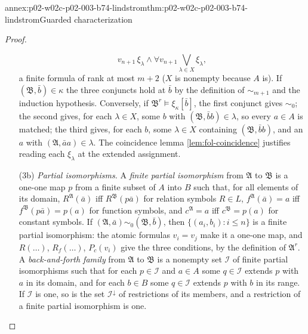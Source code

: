 \begin{annexitem}{annex:p02-w02c-p02-003-b74-lindstrom}{thm:p02-w02c-p02-003-b74-lindstrom}{Guarded characterization}
\begin{proof}
\begin{enumerate}
\[       v_{n+1}\,\xi_\lambda\land\forall v_{n+1}\bigvee_{\lambda\in X}\xi_\lambda ,
      \]
      a finite formula of rank at most \(m+2\) (\(X\) is nonempty because
      \(A\) is).  If \((\mathfrak B,\bar b)\in\kappa\) the three conjuncts
      hold at \(\bar b\) by the definition of \(\sim_{m+1}\) and the
      induction hypothesis.  Conversely, if \(\mathfrak B^{r}\models\xi_\kappa
      [\bar b]\), the first conjunct gives \(\sim_0\); the second gives, for
      each \(\lambda\in X\), some \(b\) with \((\mathfrak B,\bar bb)\in
      \lambda\), so every \(a\in A\) is matched; the third gives, for each
      \(b\), some \(\lambda\in X\) containing \((\mathfrak B,\bar bb)\), and
      an \(a\) with \((\mathfrak A,\bar aa)\in\lambda\).  The coincidence lemma
      \cref{lem:fol-coincidence} justifies reading each \(\xi_\lambda\) at the
      extended assignment.
\item[(3b)] \emph{Partial isomorphisms.}  A \emph{finite partial
      isomorphism} from \(\mathfrak A\) to \(\mathfrak B\) is a one-one map
      \(p\) from a finite subset of \(A\) into \(B\) such that, for all
      elements of its domain, \(R^{\mathfrak A}(\bar a)\) iff
      \(R^{\mathfrak B}(p\bar a)\) for relation symbols \(R\in L\),
      \(f^{\mathfrak A}(\bar a)=a\) iff \(f^{\mathfrak B}(p\bar a)=p(a)\) for
      function symbols, and \(c^{\mathfrak A}=a\) iff \(c^{\mathfrak B}=p(a)\)
      for constant symbols.  If \((\mathfrak A,\bar a)\sim_0(\mathfrak
      B,\bar b)\), then \(\{(a_i,b_i):i\leq n\}\) is a finite partial
      isomorphism: the atomic formulas \(v_i=v_j\) make it a one-one map,
      and \(R(\ldots)\), \(R_f(\ldots)\), \(P_c(v_i)\) give the three
      conditions, by the definition of \(\mathfrak A^{r}\).  A
      \emph{back-and-forth family} from \(\mathfrak A\) to \(\mathfrak B\) is
      a nonempty set \(\mathcal I\) of finite partial isomorphisms such that
      for each \(p\in\mathcal I\) and \(a\in A\) some \(q\in\mathcal I\)
      extends \(p\) with \(a\) in its domain, and for each \(b\in B\) some
      \(q\in\mathcal I\) extends \(p\) with \(b\) in its range.  If
      \(\mathcal I\) is one, so is the set \(\mathcal I^{\downarrow}\) of
      restrictions of its members, and a restriction of a finite partial
      isomorphism is one.
\end{enumerate}


\end{proof}
\end{annexitem}
